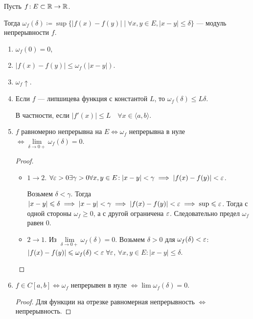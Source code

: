 \begin{definition}
    Пусть $f\!: E \subset \mathbb{R} \to \mathbb{R}$.

    Тогда $\omega_f(\delta) \coloneqq \sup \{|f(x) - f(y)|\mid \forall x, y \in E, |x-y| \le \delta\}$ --- модуль непрерывности $f$.
\end{definition}
\begin{properties}
    \begin{enumerate}
        \item $\omega_f(0) = 0$,
        \item $|f(x) - f(y)| \le \omega_f(|x-y|)$.
        \item $\omega_f \uparrow$.
        \item Если  $f$ --- липшицева функция с константой $L$, то  $\omega_f(\delta) \le L \delta$.

            В частности, если $|f'(x)| \le L\quad \forall x \in \langle a, b \rangle$.
        \item $f$ равномерно непрерывна на $E \iff \omega_f$ непрерывна в нуле  $\iff \lim\limits_{\delta \to 0+} \omega_f(\delta) = 0$.
            \begin{proof}
                 \begin{itemize}
                     \item $1 \to 2$.  $\forall \varepsilon > 0 \exists \gamma > 0 \forall x, y \in E\!: |x-y| < \gamma \implies |f(x) - f(y)| < \varepsilon$. 

                         Возьмем  $\delta < \gamma$. Тогда $|x-y| \leqslant \delta \implies |x-y| < \gamma \implies |f(x) - f(y)| < \varepsilon \implies \sup \leqslant \varepsilon$. Тогда с одной стороны $\omega_f \ge 0$, а с другой ограничена $\varepsilon$. Следовательно предел $\omega_f$ равен  $0$.
                     \item $2 \to 1$. Из $\lim\limits_{\delta \to 0+} \omega_f(\delta) = 0$. Возьмем  $\delta > 0$ для $\omega_f(\delta) < \varepsilon$:  $|f(x) - f(y)| \le \omega_f(\delta) < \eps\ \forall \eps$, $\forall x, y \in E\!: |x-y| \le \delta$.
                \end{itemize}
            \end{proof}
        \item $f \in C[a, b] \iff \omega_f$ непрерывен в нуле $\iff \lim \omega_f(\delta)= 0$. 
             \begin{proof}
                 Для функции на отрезке равномерная непрерывность $\iff $ непрерывность.
             \end{proof}
    \end{enumerate}
\end{properties}
